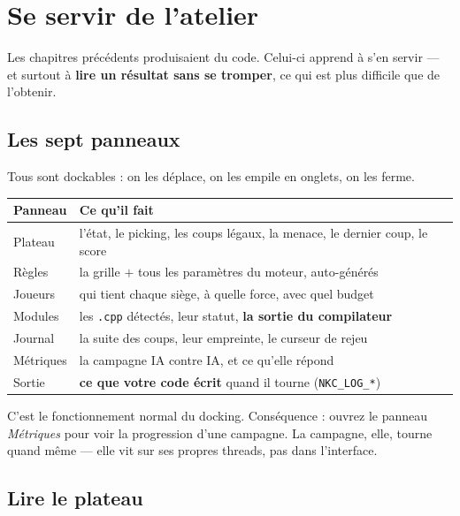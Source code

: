 \chapter{Se servir de l'atelier}

Les chapitres précédents produisaient du code. Celui-ci apprend à s'en servir —
et surtout à \textbf{lire un résultat sans se tromper}, ce qui est plus difficile
que de l'obtenir.

\section{Les sept panneaux}

Tous sont dockables : on les déplace, on les empile en onglets, on les ferme.

\begin{center}
\begin{tabular}{@{}p{2.4cm}p{11.4cm}@{}}
\toprule
\textbf{Panneau} & \textbf{Ce qu'il fait} \\
\midrule
Plateau & l'état, le picking, les coups légaux, la menace, le dernier coup, le score \\
Règles & la grille $+$ tous les paramètres du moteur, auto-générés \\
Joueurs & qui tient chaque siège, à quelle force, avec quel budget \\
Modules & les \texttt{.cpp} détectés, leur statut, \textbf{la sortie du compilateur} \\
Journal & la suite des coups, leur empreinte, le curseur de rejeu \\
Métriques & la campagne IA contre IA, et ce qu'elle répond \\
Sortie & \textbf{ce que votre code écrit} quand il tourne (\texttt{NKC\_LOG\_*}) \\
\bottomrule
\end{tabular}
\end{center}

\begin{nkpiege}
C'est le fonctionnement normal du docking. Conséquence : ouvrez le panneau
\emph{Métriques} pour voir la progression d'une campagne. La campagne, elle,
tourne quand même — elle vit sur ses propres threads, pas dans l'interface.
\end{nkpiege}

\section{Lire le plateau}

